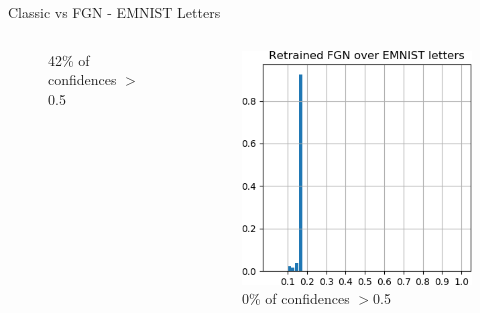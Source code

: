 \documentclass{beamer}
\begin{document}
\begin{frame}{Classic vs FGN - EMNIST Letters}
\begin{columns}
\begin{column}{.33\textwidth}
\begin{figure}
        \centering \tiny{42\% of confidences $>$0.5}
    \end{figure}
    \end{column}
    \begin{column}{.33\textwidth}
    \begin{figure}
        \includegraphics[width=.85\textwidth]{images/Letters/hist-retrained-letters.png}\\
        \centering \tiny{0\% of confidences $>$0.5}
    \end{figure}
    \end{column}
    \end{columns}
    

\end{frame}
\end{document}
